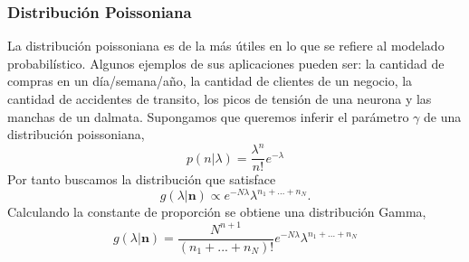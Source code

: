 \subsubsection{Distribuci\'on Poissoniana}
La distribuci\'on poissoniana es de la m\'as \'utiles en lo que se refiere al modelado probabil\'istico. Algunos ejemplos de sus aplicaciones pueden ser: la cantidad de compras en un d\'ia/semana/a\~no, la cantidad de clientes de un negocio, la cantidad de accidentes de transito, los picos de tensi\'on de una neurona y las manchas de un dalmata. Supongamos que queremos inferir el par\'ametro $\gamma$ de una distribuci\'on poissoniana,
\begin{equation}
    p(n|\lambda) = \frac{\lambda^n}{n!}e^{-\lambda}
\end{equation}
Por tanto buscamos la distribuci\'on que satisface
\begin{equation}
    g(\lambda|\mathbf{n}) \propto e^{ -N\lambda}\lambda^{n_1+...+n_N}.
\end{equation}
Calculando la constante de proporci\'on se obtiene una distribuci\'on Gamma,
\begin{equation}
    g(\lambda|\mathbf{n}) = \frac{N^{n+1}}{(n_1+...+n_N)!}e^{-N\lambda}\lambda^{n_1+...+n_N}
\end{equation}
